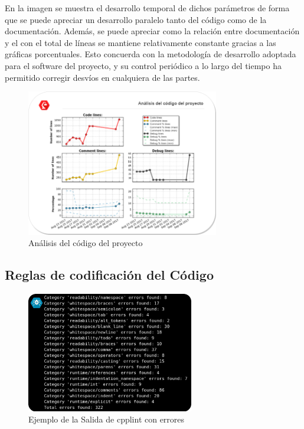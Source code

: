     En la imagen se muestra el desarrollo temporal de dichos parámetros de forma que se puede apreciar un desarrollo paralelo tanto del código como de la documentación. Además, se puede apreciar como la relación entre documentación y el  con el total de líneas se mantiene relativamente constante gracias a las gráficas porcentuales. Esto concuerda con la metodología de desarrollo adoptada para el software del proyecto, y su control periódico a lo largo del tiempo ha permitido corregir desvíos en cualquiera de las partes.

    \begin{figure}[H]
        \centering
        \includegraphics[width=0.75\textwidth]{figuras/Imagenes_SW/analisis_codigo.png}
        \caption{Análisis del código del proyecto}
        \label{fig:SW:code_analysis}
    \end{figure}

    \subsection{Reglas de codificación del Código}

    \begin{figure}[H]
    	\centering
    	\includegraphics[width=0.65\textwidth]{figuras/Imagenes_SW/test/ReadibilityTest.jpg}
    	\caption{Ejemplo de la Salida de cpplint con errores}
    	\label{fig:SW:test:codif_output}
    \end{figure}

